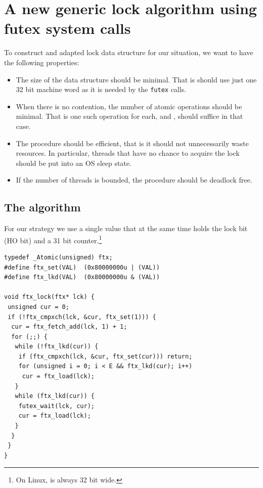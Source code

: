 \section{A new generic lock algorithm using futex system calls}
\label{sec-3}

\iflong%
To construct and adapted lock data structure for our situation, we
want to have the following properties:

\begin{itemize}
\item The size of the data structure should be minimal. That is should
use just one 32 bit machine word as it is needed by the \texttt{futex}
calls.\itemadjust

\item When there is no contention, the number of atomic operations should
be minimal. That is one such operation for each,  and
, should suffice in that case.\itemadjust

\item The procedure should be efficient, that is it should not
unnecessarily waste resources. In particular, threads that have no
chance to acquire the lock should be put into an OS sleep
state.\itemadjust

\item If the number of threads is bounded, the procedure should be
deadlock free.\itemadjust
\end{itemize}

\subsection{The algorithm}
\label{sec-3-1}
\fi

For our strategy we use a single  value that at the same
time holds the lock bit (HO bit) and a 31 bit counter.\footnote{On Linux,  is always 32 bit wide.}

\lstset{language=C11,label= ,caption= ,numbers=none}
\begin{lstlisting}
typedef _Atomic(unsigned) ftx;
#define ftx_set(VAL)  (0x80000000u | (VAL))
#define ftx_lkd(VAL)  (0x80000000u & (VAL))

void ftx_lock(ftx* lck) {
 unsigned cur = 0;
 if (!ftx_cmpxch(lck, &cur, ftx_set(1))) {
  cur = ftx_fetch_add(lck, 1) + 1;
  for (;;) {
   while (!ftx_lkd(cur)) {
    if (ftx_cmpxch(lck, &cur, ftx_set(cur))) return;
    for (unsigned i = 0; i < E && ftx_lkd(cur); i++)
     cur = ftx_load(lck);
   }
   while (ftx_lkd(cur)) {
    futex_wait(lck, cur);
    cur = ftx_load(lck);
   }
  }
 }
}
\end{lstlisting}

